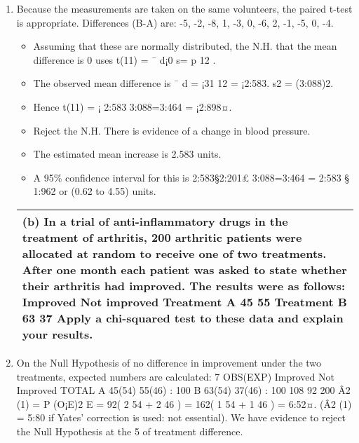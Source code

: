 \documentclass[a4paper,12pt]{article}
\begin{document}
\begin{enumerate}
\item Because the measurements are taken on the same volunteers, the paired t-test is appropriate.
Differences (B-A) are: -5, -2, -8, 1, -3, 0, -6, 2, -1, -5, 0, -4.
\begin{itemize}
\item Assuming that these are normally distributed, the N.H. that the mean difference is 0
uses t(11) = ¯ d¡0
s=
p
12
.
\item The observed mean difference is ¯ d = ¡31
12 = ¡2:583. s2 = (3:088)2.
\item Hence t(11) = ¡ 2:583
3:088=3:464 = ¡2:898¤.

    \item Reject the N.H. There is evidence of a change in blood pressure.
\item The estimated mean increase is 2.583 units. 
\item A 95\% confidence interval for this is 2:583§2:201£
3:088=3:464 = 2:583 § 1:962 or (0.62 to 4.55) units.
\end{itemize}
\newpage
\begin{table}[ht!]
 
\centering
 
\begin{tabular}{|p{15cm}|}
 
\hline  

(b) In a trial of anti-inflammatory drugs in the treatment of arthritis, 200 arthritic patients were allocated at random to receive one of two treatments.  After one month each patient was asked to state whether their arthritis had improved.  The results were as follows:
Improved           Not improved
Treatment A     45  55 Treatment B     63  37
Apply a chi-squared test to these data and explain your results.
\\ \hline
  
\end{tabular}

\end{table}
\item On the Null Hypothesis of no difference in improvement under the two treatments, expected
numbers are calculated:
7
OBS(EXP) Improved Not Improved TOTAL
A 45(54) 55(46) : 100
B 63(54) 37(46) : 100
108 92 200
Â2
(1) =
P (O¡E)2
E = 92( 2
54 + 2
46 ) = 162( 1
54 + 1
46 ) = 6:52¤.
(Â2
(1) = 5:80 if Yates’ correction is used: not essential).
We have evidence to reject the Null Hypothesis at the 5%
of treatment difference.\end{enumerate}
\end{document}

